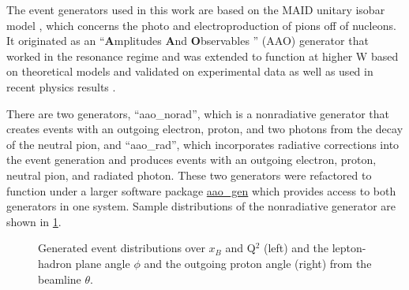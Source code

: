 The event generators used in this work are based on the MAID unitary isobar model \parencite{Tiator2006MAIDTechniques}, \parencite{Dreschsel1992ThresholdNucleons} which concerns the photo and electroproduction of pions off of nucleons. It originated as an ``\textbf{A}mplitudes \textbf{A}nd \textbf{O}bservables '' (AAO) generator that worked in the resonance regime \parencite{Burkert1991AmplitudesGenerator} and was extended to function at higher W based on theoretical models \parencite{Goloskokov2010AnElectroproduction} and validated on experimental data \parencite{Bedlinskiy2014ExclusiveCLAS} as well as used in recent physics results \parencite{Diehl2022MultidimensionalRegion}. 

There are two generators, ``aao\_norad'', which is a nonradiative generator that creates events with an outgoing electron, proton, and two photons from the decay of the neutral pion, and ``aao\_rad'', which incorporates radiative corrections into the event generation and produces events with an outgoing electron, proton, neutral pion, and radiated photon. These two generators were refactored to function under a larger software package \href{https://github.com/JeffersonLab/aao_gen}{aao\_gen} which provides access to both generators in one system. Sample distributions of the nonradiative generator are shown in \ref{fig:aao_norad_gen}.

    \begin{figure}[H]
        \centering
        \hfill
        \caption[Generated Event Distributions]{Generated event distributions over $x_B$ and Q$^2$ (left) and the lepton-hadron plane angle $\phi$ and the outgoing proton angle (right) from the beamline $\theta$.}\label{fig:aao_norad_gen}
    \end{figure}


